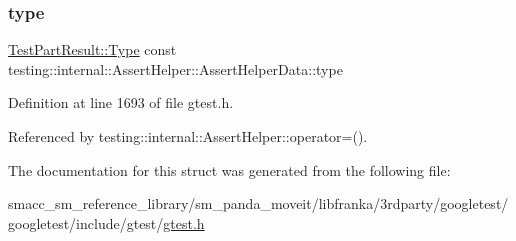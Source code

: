 \subsubsection{\texorpdfstring{type}{type}}
{\footnotesize\ttfamily \hyperlink{classtesting_1_1TestPartResult_a65ae656b33fdfdfffaf34858778a52d5}{Test\+Part\+Result\+::\+Type} const testing\+::internal\+::\+Assert\+Helper\+::\+Assert\+Helper\+Data\+::type}



Definition at line 1693 of file gtest.\+h.



Referenced by testing\+::internal\+::\+Assert\+Helper\+::operator=().



The documentation for this struct was generated from the following file\+:\begin{DoxyCompactItemize}
\item 
smacc\+\_\+sm\+\_\+reference\+\_\+library/sm\+\_\+panda\+\_\+moveit/libfranka/3rdparty/googletest/googletest/include/gtest/\hyperlink{gtest_8h}{gtest.\+h}\end{DoxyCompactItemize}
